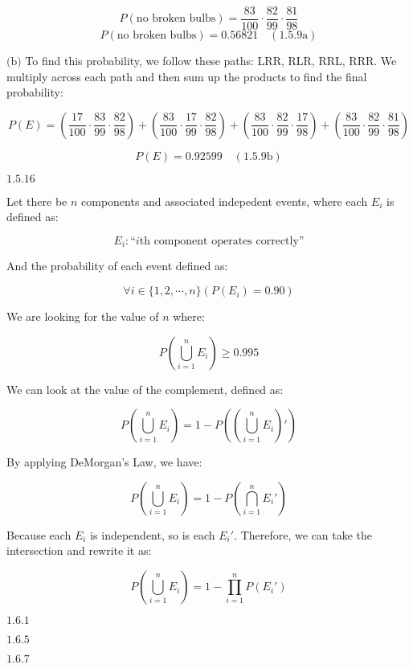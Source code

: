\documentclass{article}
\newcommand{\problem}[2]{$\boxed{\text{#1.#2}}$}
\newcommand{\subproblem}[3]{$\boxed{\text{(#3)}}$}
\newcommand{\subsolution}[4]{\boxed{#4\quad(\text{#1.#2#3})}}
\begin{document}
\[
P(\text{no broken bulbs})=\dfrac{83}{100}\cdot\dfrac{82}{99}\cdot\dfrac{81}{98}
\] \[
\subsolution{1.5}{9}{a}{P(\text{no broken bulbs})=0.56821}
\]

\subproblem{1.5}{9}{b} To find this probability, we follow these
paths: LRR, RLR, RRL, RRR. We multiply across each path and then sum
up the products to find the final probability:

\[
P(E)=
\left(\dfrac{17}{100}\cdot
\dfrac{83}{99}\cdot
\dfrac{82}{98}\right)
+
\left(\dfrac{83}{100}\cdot
\dfrac{17}{99}\cdot
\dfrac{82}{98}\right)
+
\left(\dfrac{83}{100}\cdot
\dfrac{82}{99}\cdot
\dfrac{17}{98}\right)
+
\left(\dfrac{83}{100}\cdot
\dfrac{82}{99}\cdot
\dfrac{81}{98}\right)
\]

\[
\subsolution{1.5}{9}{b}{P(E)=0.92599}
\]

%
\problem{1.5}{16}

Let there be $n$ components and associated indepedent events, where
each $E_i$ is defined as:

\[
E_i:\text{``$i$th component operates correctly''}
\]

And the probability of each event defined as:

\[
\forall i\in\{1,2,\cdots,n\}(P(E_i)=0.90)
\]

We are looking for the value of $n$ where:

\[
P\left(\bigcup\limits_{i=1}^n E_i\right)\ge 0.995
\]

We can look at the value of the complement, defined as:

\[
P\left(\bigcup\limits_{i=1}^n E_i\right)=
1 - P\left(\left(\bigcup\limits_{i=1}^nE_i\right)'\right)
\]

By applying DeMorgan's Law, we have:

\[
P\left(\bigcup\limits_{i=1}^n E_i\right)=
1 - P\left(\bigcap\limits_{i=1}^nE_i'\right)
\]

Because each $E_i$ is independent, so is each $E_i'$. Therefore, we
can take the intersection and rewrite it as:

\[
P\left(\bigcup\limits_{i=1}^n E_i\right)=
1 - \prod\limits_{i=1}^nP(E_i')
\]

\problem{1.6}{1}




\problem{1.6}{5}




\problem{1.6}{7}
\end{document}
